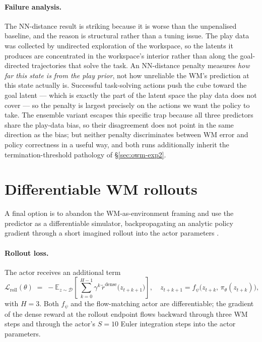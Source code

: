 \paragraph{Failure analysis.}
The NN-distance result is striking because it is worse than the
unpenalised baseline, and the reason is structural rather than a tuning
issue. The play data was collected by undirected exploration of the
workspace, so the latents it produces are concentrated in the
workspace's interior rather than along the goal-directed trajectories
that solve the task. An NN-distance penalty measures \emph{how far
this state is from the play prior}, not how unreliable the WM's
prediction at this state actually is. Successful task-solving actions
push the cube toward the goal latent --- which is exactly the part of
the latent space the play data does not cover --- so the penalty is
largest precisely on the actions we want the policy to take. The
ensemble variant escapes this specific trap because all three
predictors share the play-data bias, so their disagreement does not
point in the same direction as the bias; but neither penalty
discriminates between WM error and policy correctness in a useful way,
and both runs additionally inherit the termination-threshold pathology
of §\ref{sec:owm-exp2}.

\section{Differentiable WM rollouts}
\label{sec:owm-exp8}

A final option is to abandon the WM-as-environment framing and use the
predictor as a differentiable simulator, backpropagating an analytic
policy gradient through a short imagined rollout into the actor
parameters \cite{heess2015svg, hafner2020dreamer}.

\paragraph{Rollout loss.}
The actor receives an additional term
\begin{equation}
    \mathcal{L}_{\text{roll}}(\theta) \;=\;
        -\mathbb{E}_{z\sim\mathcal{D}}\!\left[\,\sum_{k=0}^{H-1}\gamma^{k}\,
            \tilde r^{\text{dense}}\!\big(z_{t+k+1}\big)\right],
    \quad
    z_{t+k+1} = f_\psi\!\big(z_{t+k},\,\pi_\theta(z_{t+k})\big),
    \label{eq:owm-rollout-loss}
\end{equation}
with $H = 3$. Both $f_\psi$ and the flow-matching actor are
differentiable; the gradient of the dense reward at the rollout
endpoint flows backward through three WM steps and through the actor's
$S = 10$ Euler integration steps into the actor parameters.

